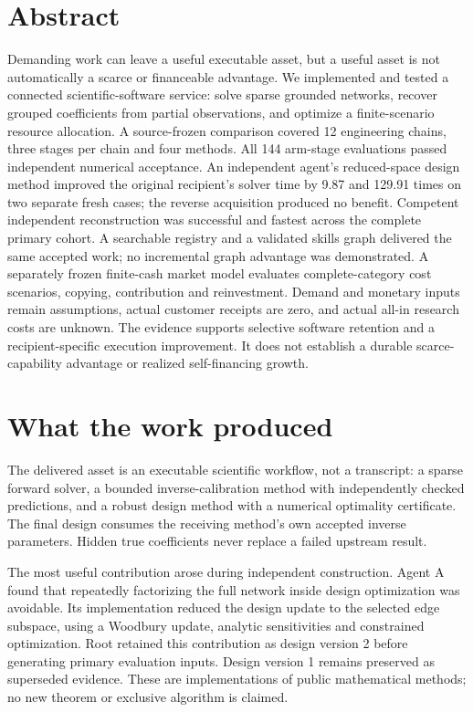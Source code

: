 \section*{Abstract}

Demanding work can leave a useful executable asset, but a useful asset is not automatically a scarce or financeable advantage. We implemented and tested a connected scientific-software service: solve sparse grounded networks, recover grouped coefficients from partial observations, and optimize a finite-scenario resource allocation. A source-frozen comparison covered 12 engineering chains, three stages per chain and four methods. All 144 arm-stage evaluations passed independent numerical acceptance. An independent agent's reduced-space design method improved the original recipient's solver time by 9.87 and 129.91 times on two separate fresh cases; the reverse acquisition produced no benefit. Competent independent reconstruction was successful and fastest across the complete primary cohort. A searchable registry and a validated skills graph delivered the same accepted work; no incremental graph advantage was demonstrated. A separately frozen finite-cash market model evaluates complete-category cost scenarios, copying, contribution and reinvestment. Demand and monetary inputs remain assumptions, actual customer receipts are zero, and actual all-in research costs are unknown. The evidence supports selective software retention and a recipient-specific execution improvement. It does not establish a durable scarce-capability advantage or realized self-financing growth.

\section{What the work produced}

The delivered asset is an executable scientific workflow, not a transcript: a sparse forward solver, a bounded inverse-calibration method with independently checked predictions, and a robust design method with a numerical optimality certificate. The final design consumes the receiving method's own accepted inverse parameters. Hidden true coefficients never replace a failed upstream result.

The most useful contribution arose during independent construction. Agent A found that repeatedly factorizing the full network inside design optimization was avoidable. Its implementation reduced the design update to the selected edge subspace, using a Woodbury update, analytic sensitivities and constrained optimization. Root retained this contribution as design version 2 before generating primary evaluation inputs. Design version 1 remains preserved as superseded evidence. These are implementations of public mathematical methods; no new theorem or exclusive algorithm is claimed.

